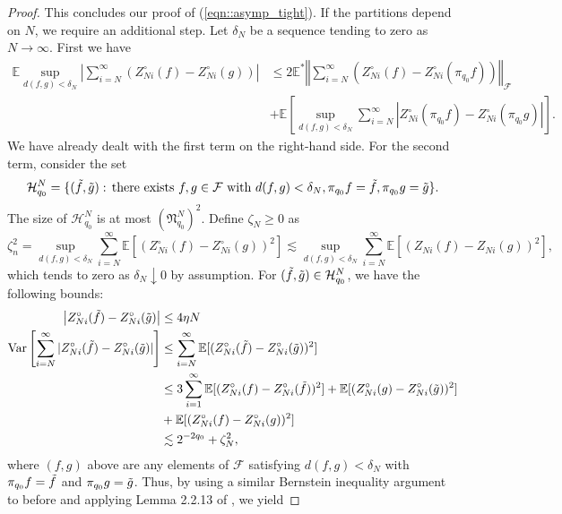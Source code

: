 \documentclass[11pt,a4paper]{article}
\newcommand{\E}{\mathbb{E}}
\begin{document}
\begin{appendices}
\begin{proof}
    This concludes our proof of (\ref{eqn::asymp_tight}). If the partitions depend on $N$, we require an additional step. Let $\delta_{N}$ be a sequence tending to zero as $N \rightarrow \infty$. First we have
    \begin{align*}
        \E \sup_{d(f,g) < \delta_{N}}\left|\sum_{i=N}^{\infty} (Z_{Ni}^{\circ}(f) - Z_{Ni}^{\circ}(g))\right| &\leq 2\E^{*} \left\Vert \sum_{i=N}^{\infty} (Z_{Ni}^{\circ}(f) - Z_{Ni}^{\circ}(\pi_{q_0}f))\right\Vert_{\mathcal{F}}\\
        &+\E\left[ \sup_{d(f,g) < \delta_{N}} \sum_{i=N}^{\infty} \left|Z_{Ni}^{\circ}(\pi_{q_0}f) - Z_{Ni}^{\circ}(\pi_{q_0}g)\right|\right].
    \end{align*}
    We have already dealt with the first term on the right-hand side. For the second term, consider the set
    \begin{equation*}
        \mathcal{H}^{N}_{q_0} = \{(\Tilde{f},\Tilde{g}):\, \text{there exists }f,g\in\mathcal{F}\text{ with }d(f,g) <\delta_{N}, \pi_{q_0}f = \Tilde{f}, \pi_{q_{0}}g = \Tilde{g} \}.
    \end{equation*}
    The size of $\mathcal{H}^{N}_{q_0}$ is at most $(\mathfrak{N}_{q_0}^{N})^{2}$. Define $\zeta_{N} \geq 0$ as
    \begin{equation*}
        \zeta^{2}_{n} = \sup_{d(f,g)< \delta_{N}}\sum_{i=N}^{\infty}\E[(Z_{Ni}^{\circ}(f)-Z_{Ni}^{\circ}(g))^{2}] \lesssim \sup_{d(f,g)< \delta_{N}}\sum_{i=N}^{\infty}\E[(Z_{Ni}(f)-Z_{Ni}(g))^{2}],
    \end{equation*}
    which tends to zero as $\delta_{N} \downarrow 0$ by assumption. For $(\Tilde{f},\Tilde{g}) \in \mathcal{H}_{q_0}^{N}$, we have the following bounds:
    \begin{align*}
        \left|Z_{Ni}^{\circ}(\Tilde{f}) - Z_{Ni}^{\circ}(\Tilde{g})\right| &\leq 4\eta{N}\\
        \text{Var}\left[\sum_{i=N}^{\infty} |Z_{Ni}^{\circ}(\Tilde{f})-Z_{Ni}^{\circ}(\Tilde{g})|\right] &\leq \sum_{i=N}^{\infty}\E[(Z_{Ni}^{\circ}(\Tilde{f}) - Z_{Ni}^{\circ}(\Tilde{g}))^{2}] \\ 
        &\leq 3\sum_{i=1}^{\infty}\E[(Z_{Ni}^{\circ}(f) - Z_{Ni}^{\circ}(\Tilde{f}))^{2}] +\E[(Z_{Ni}^{\circ}(g) - Z_{Ni}^{\circ}(\Tilde{g}))^{2}]\\&+\E[(Z_{Ni}^{\circ}(f) - Z_{Ni}^{\circ}(g))^{2}]\\
        &\lesssim 2^{-2q_{0}} + \zeta_{N}^{2},
    \end{align*}
    where $(f,g)$ above are any elements of $\mathcal{F}$ satisfying $d(f,g) < \delta_{N}$ with $\pi_{q_0}f = \Tilde{f}$ and $\pi_{q_0}g = \Tilde{g}$. Thus, by using a similar Bernstein inequality argument to before and applying Lemma 2.2.13 of \cite{vanderVaart2023}, we yield

\end{proof}
\end{appendices}
\end{document}

